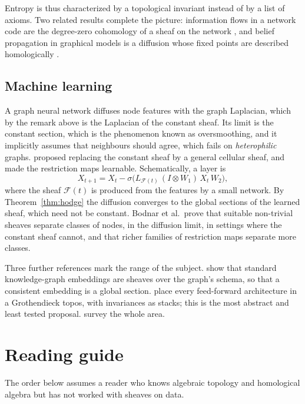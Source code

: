 \documentclass[11pt,a4paper,oneside]{scrartcl}
\theoremstyle{guideplain}
\theoremstyle{guidedef}
\newcommand{\F}{\mathcal{F}}
\begin{document}
Entropy is thus characterized by a topological invariant instead of by a list of axioms. Two related
results complete the picture: information flows in a network code are the degree-zero cohomology of
a sheaf on the network \autocite{ghristhiraoka2011}, and belief propagation in graphical models is a
diffusion whose fixed points are described homologically \autocite{peltre2020}.

\subsection{Machine learning}\label{sec:ml}

A graph neural network diffuses node features with the graph Laplacian, which by the remark above is
the Laplacian of the constant sheaf. Its limit is the constant section, which is the phenomenon known
as oversmoothing, and it implicitly assumes that neighbours should agree, which fails on
\emph{heterophilic} graphs. \textcite{hansengebhart2020} proposed replacing the constant sheaf by a
general cellular sheaf, and \textcite{bodnar2022} made the restriction maps learnable. Schematically,
a layer is
\[
  X_{t+1}=X_t-\sigma\bigl(L_{\F(t)}\,(I\otimes W_1)\,X_t\,W_2\bigr),
\]
where the sheaf $\F(t)$ is produced from the features by a small network. By
Theorem~\ref{thm:hodge} the diffusion converges to the global sections of the learned sheaf, which
need not be constant. Bodnar et al.\ prove that suitable non-trivial sheaves separate classes of
nodes, in the diffusion limit, in settings where the constant sheaf cannot, and that richer families
of restriction maps separate more classes.

Three further references mark the range of the subject. \textcite{gebhart2023} show that standard
knowledge-graph embeddings are sheaves over the graph's schema, so that a consistent embedding is a
global section. \textcite{belfiore2021} place every feed-forward architecture in a Grothendieck
topos, with invariances as stacks; this is the most abstract and least tested proposal.
\textcite{ayzenberg2025} survey the whole area.

\section{Reading guide}\label{sec:guide}

The order below assumes a reader who knows algebraic topology and homological algebra but has not
worked with sheaves on data.
\end{document}
